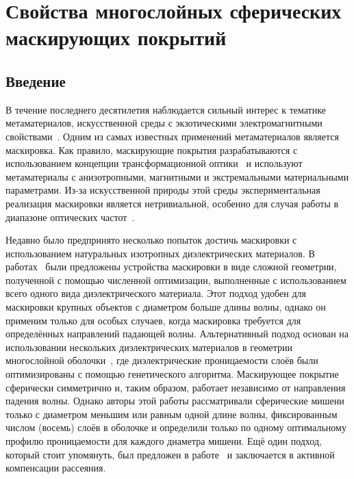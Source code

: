 \chapter{Свойства многослойных сферических маскирующих
  покрытий} \label{chapt3}
\section{Введение}
В течение последнего десятилетия наблюдается сильный интерес к
тематике метаматериалов, искусственной среды с экзотическими
электромагнитными свойствами~\cite{Smith-2004,
  Schurig-2006, Shalaev-2007, Kivshar-2012}. Одним из самых известных
применений метаматериалов является маскировка. Как правило,
маскирующие покрытия разрабатываются с использованием концепции
трансформационной оптики~\cite{pendry_TO, Leonhardt-2006} и
используют метаматериалы с анизотропными, магнитными и экстремальными
материальными параметрами. Из-за искусственной природы этой среды
экспериментальная реализация маскировки является нетривиальной,
особенно для случая работы в диапазоне оптических
частот~\cite{Kildishev:2011, alu, XU-Su:120408, Alu-2005}. 

Недавно было предпринято несколько попыток достичь маскировки с
использованием натуральных изотропных диэлектрических материалов. В
работах~\cite{Sigmund-AllDiel-2011, smith-3dprinterCloak-2013,
  Fujii_topolOpti_theory_2013,
  ma-experiment-topology-2013,LayeredShell,MOP:MOP27024} были
предложены устройства маскировки в виде сложной геометрии, полученной
с помощью численной оптимизации, выполненные с использованием всего
одного вида диэлектрического материала.  Этот подход удобен для
маскировки крупных объектов с диаметром больше длины волны, однако он
применим только для особых случаев, когда маскировка требуется для
определённых направлений падающей волны. Альтернативный подход основан
на использовании нескольких диэлектрических материалов в геометрии
многослойной оболочки~\cite{Semouchkina-2013, semouchkina2}, где
диэлектрические проницаемости слоёв были оптимизированы с помощью
генетического алгоритма. Маскирующее покрытие сферически симметрично
и, таким образом, работает независимо от направления падения
волны. Однако авторы этой работы рассматривали сферические
мишени только с диаметром меньшим или равным одной длине волны,
фиксированным числом (восемь) слоёв в оболочке и определили только по
одному оптимальному профилю проницаемости для каждого диаметра мишени.
Ещё один подход, который стоит упомянуть, был предложен в
работе~\cite{Elefteriades_ActiveCloak_2013} и заключается в активной
компенсации рассеяния.

